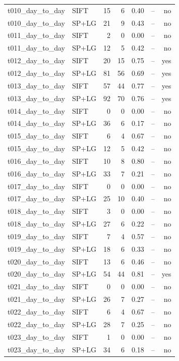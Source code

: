 \begin{longtable}{llrrrrr}
t010\_day\_to\_day & SIFT & 15 & 6 & 0.40 & -- & no \\
t010\_day\_to\_day & SP+LG & 21 & 9 & 0.43 & -- & no \\
t011\_day\_to\_day & SIFT & 2 & 0 & 0.00 & -- & no \\
t011\_day\_to\_day & SP+LG & 12 & 5 & 0.42 & -- & no \\
t012\_day\_to\_day & SIFT & 20 & 15 & 0.75 & -- & yes \\
t012\_day\_to\_day & SP+LG & 81 & 56 & 0.69 & -- & yes \\
t013\_day\_to\_day & SIFT & 57 & 44 & 0.77 & -- & yes \\
t013\_day\_to\_day & SP+LG & 92 & 70 & 0.76 & -- & yes \\
t014\_day\_to\_day & SIFT & 0 & 0 & 0.00 & -- & no \\
t014\_day\_to\_day & SP+LG & 36 & 6 & 0.17 & -- & no \\
t015\_day\_to\_day & SIFT & 6 & 4 & 0.67 & -- & no \\
t015\_day\_to\_day & SP+LG & 12 & 5 & 0.42 & -- & no \\
t016\_day\_to\_day & SIFT & 10 & 8 & 0.80 & -- & no \\
t016\_day\_to\_day & SP+LG & 33 & 7 & 0.21 & -- & no \\
t017\_day\_to\_day & SIFT & 0 & 0 & 0.00 & -- & no \\
t017\_day\_to\_day & SP+LG & 25 & 10 & 0.40 & -- & no \\
t018\_day\_to\_day & SIFT & 3 & 0 & 0.00 & -- & no \\
t018\_day\_to\_day & SP+LG & 27 & 6 & 0.22 & -- & no \\
t019\_day\_to\_day & SIFT & 7 & 4 & 0.57 & -- & no \\
t019\_day\_to\_day & SP+LG & 18 & 6 & 0.33 & -- & no \\
t020\_day\_to\_day & SIFT & 13 & 6 & 0.46 & -- & no \\
t020\_day\_to\_day & SP+LG & 54 & 44 & 0.81 & -- & yes \\
t021\_day\_to\_day & SIFT & 0 & 0 & 0.00 & -- & no \\
t021\_day\_to\_day & SP+LG & 26 & 7 & 0.27 & -- & no \\
t022\_day\_to\_day & SIFT & 6 & 4 & 0.67 & -- & no \\
t022\_day\_to\_day & SP+LG & 28 & 7 & 0.25 & -- & no \\
t023\_day\_to\_day & SIFT & 1 & 0 & 0.00 & -- & no \\
t023\_day\_to\_day & SP+LG & 34 & 6 & 0.18 & -- & no \\
\end{longtable}\endgroup
